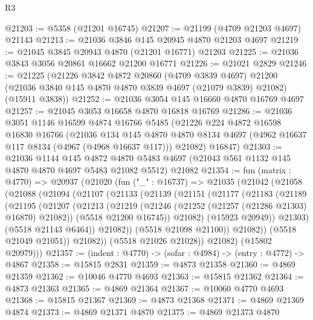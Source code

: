 \begin{lexlean}{R3}
\begin{coremodule}
@21203 := @5358 (@21201 @16745)
@21207 := @21199 (@4709 @21203 @4697) @21143
@21213 := @21036 @3846 @145 @20945 @4870 @21203 @4697
@21219 := @21045 @3845 @20943 @4870 (@21201 @16771) @21203
@21225 := @21036 @3843 @3056 @20861 @16662 @21200 @16771
@21226 := @21021 @2829
@21246 := @21225
    (@21226
      @3842
      @4872
      @20860
      (@4709 @3839 @4697)
      @21200
      (@21036 @3840 @145 @4870 @4870 @3839 @4697 (@21079 @3839) @21082)
      (@15911 @3838))
@21252 := @21036 @3054 @145 @16660 @4870 @16769 @4697
@21257 := @21045 @3053 @16658 @4870 @16818 @16769
@21286 := @21036
    @3051
    @1146
    @16599
    @4874
    @16766
    @5485
    (@21226
      @224
      @4872
      @16598
      @16830
      @16766
      (@21036
        @134
        @145
        @4870
        @4870
        @8134
        @4697
        (@4962 @16637 @117 @8134 (@4967 (@4968 @16637 @117)))
        @21082)
      @16847)
@21303 := @21036
    @1144
    @145
    @4872
    @4870
    @5483
    @4697
    (@21043 @561 @1132 @145 @4870 @4870 @4697 @5483 @21082 @5512)
    @21082
@21354 := fun (matrix : @4770) =>
  @20937
    (@21020
      (fun ("_" : @16737) =>
      @21035
        (@21042
          (@21058
            (@21088
              (@21094
                (@21107
                  (@21133
                    (@21139
                      (@21151
                        (@21177
                          (@21183
                            (@21189
                              (@21195
                                (@21207
                                  (@21213
                                    (@21219
                                      (@21246 (@21252 (@21257 (@21286 @21303) @16870) @21082))
                                      (@5518 @21200 @16745))
                                    @21082)
                                  (@15923 @20949))
                                @21303)
                              (@5518 @21143 @6464))
                            @21082))
                        (@5518 @21098 @21100))
                      @21082))
                  (@5518 @21049 @21051))
                @21082))
            (@5518 @21026 @21028))
          @21082)
        (@15802 @20979)))
@21357 := (indent : @4770) -> (sofar : @4984) -> (entry : @4772) -> @4867
@21358 := @15815 @2831
@21359 := @4873 @21358
@21360 := @4869 @21359
@21362 := @10046 @4770 @4693
@21363 := @15815 @21362
@21364 := @4873 @21363
@21365 := @4869 @21364
@21367 := @10060 @4770 @4693
@21368 := @15815 @21367
@21369 := @4873 @21368
@21371 := @4869 @21369 @4874
@21373 := @4869 @21371 @4870
@21375 := @4869 @21373 @4870

\end{coremodule}
\end{lexlean}
